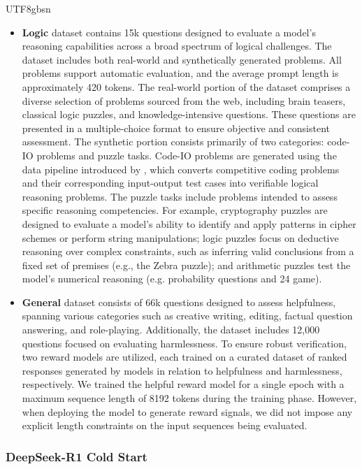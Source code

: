 \documentclass[11pt, a4paper, logo, copyright, nonumbering]{deepseek}
\newcommand{\dsri}{DeepSeek-R1}
\begin{document}
\begin{CJK*}{UTF8}{gbsn}
\begin{itemize}
\item \textbf{Logic} dataset contains 15k questions designed to evaluate a model’s reasoning capabilities across a broad spectrum of logical challenges.  The dataset includes both real-world and synthetically generated problems. All problems support automatic evaluation, and the average prompt length is approximately 420 tokens.
The real-world portion of the dataset comprises a diverse selection of problems sourced from the web, including brain teasers, classical logic puzzles, and knowledge-intensive questions.  These questions are presented in a multiple-choice format to ensure objective and consistent assessment.
The synthetic portion consists primarily of two categories: code-IO problems and puzzle tasks. Code-IO problems are generated using the data pipeline introduced by \cite{li2025codei}, which converts competitive coding problems and their corresponding input-output test cases into verifiable logical reasoning problems. The puzzle tasks include problems intended to assess specific reasoning competencies. For example, cryptography puzzles are designed to evaluate a model's ability to identify and apply patterns in cipher schemes or perform string manipulations; logic puzzles focus on deductive reasoning over complex constraints, such as inferring valid conclusions from a fixed set of premises (e.g., the Zebra puzzle); and arithmetic puzzles test the model’s numerical reasoning (e.g. probability questions and 24 game).

\item \textbf{General} dataset consists of 66k questions designed to assess helpfulness, spanning various categories such as creative writing, editing, factual question answering, and role-playing. Additionally, the dataset includes 12,000 questions focused on evaluating harmlessness. To ensure robust verification, two reward models are utilized, each trained on a curated dataset of ranked responses generated by models in relation to helpfulness and harmlessness, respectively. We trained the helpful reward model for a single epoch with a maximum sequence length of 8192 tokens during the training phase. However, when deploying the model to generate reward signals, we did not impose any explicit length constraints on the input sequences being evaluated.
\end{itemize}

\subsubsection{\dsri{} Cold Start} \label{sec:cold-start-reason}


\end{CJK*}
\end{document}
